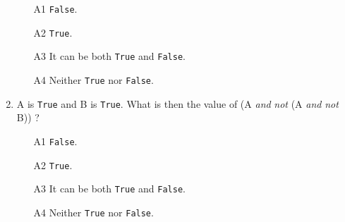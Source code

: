 \begin{enumerate}
\begin{enumerate}
\item[A1] {\tt False}.
\item[A2] {\tt True}.
\item[A3] It can be both {\tt True} and {\tt False}.
\item[A4] Neither {\tt True} nor {\tt False}.
\end{enumerate}
\item A is {\tt True} and B is {\tt True}. What is then the value of (A {\em and} {\em not} (A {\em and} {\em not} B)) ?
\begin{enumerate}
\item[A1] {\tt False}.
\item[A2] {\tt True}.
\item[A3] It can be both {\tt True} and {\tt False}.
\item[A4] Neither {\tt True} nor {\tt False}.
\end{enumerate}
\end{enumerate}




